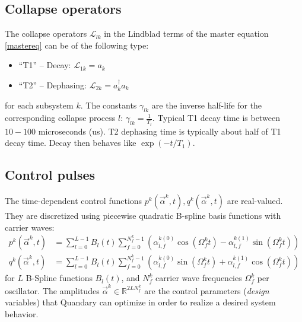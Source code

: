 \documentclass[letterpaper]{article}
\newcommand{\Ell}{\mathcal{L}}
\newcommand{\R}{\mathds{R}}
\begin{document}
\subsection{Collapse operators}
The collapse operators $\Ell_{lk}$ in the Lindblad terms of the master equation
\eqref{mastereq} can be of the following type:
\begin{itemize}
  \item ``T1'' -- Decay: $\Ell_{1k} = a_k$
  \item ``T2'' -- Dephasing: $\Ell_{2k} = a_k^{\dagger}a_k$
\end{itemize}
for each subsystem $k$. The constants $\gamma_{lk}$ are the inverse half-life
for the corresponding collapse process $l$: $\gamma_{lk} = {\frac{1}{T_l}}$.
Typical T1 decay time is between $10-100$ microseconds (us). T2
dephasing time is typically about half of T1 decay time. Decay then behaves
like $\exp(-t/{T_1})$. 

\subsection{Control pulses} \label{subsec:controlpulses}
The time-dependent control functions $p^k(\vec{\alpha}^k,t),
q^k(\vec{\alpha}^k,t)$ are real-valued. They are discretized using piecewise quadratic B-spline basis functions with
carrier waves: 
\begin{align}
  p^k(\vec{\alpha}^k,t) &= \sum_{l=0}^{L-1} B_l(t)
  \sum_{f=0}^{N_f^k-1} \left(\alpha^{k
  (0)}_{l,f} \cos(\Omega_f^k t) - \alpha^{k (1)}_{l,f} \sin(\Omega_f^k t)
  \right) \\
  q^k(\vec{\alpha}^k,t) &= \sum_{l=0}^{L-1} B_l(t)
  \sum_{f=0}^{N_f^k-1} \left( \alpha^{k
  (0)}_{l,f} \sin(\Omega_f^k t) + \alpha^{k (1)}_{l,f} \cos(\Omega_f^k t)
  \right)
\end{align}
for $L$ B-Spline functions $B_l(t)$, and $N_f^k$ carrier wave frequencies
$\Omega_f^k$ per oscillator. The amplitudes $\vec{\alpha}^k \in \R^{2LN_f^k}$ are the control
parameters (\textit{design} variables) that Quandary can optimize in order to realize a
desired system behavior. 
\end{document}
